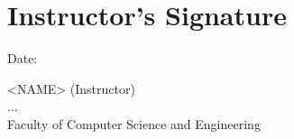 \chapter*{Instructor’s Signature}

\vspace{1cm}

\makebox[0.62\linewidth][l]{\hrulefill}\hspace{0.5cm}Date: \makebox[0.18\linewidth][l]{\hrulefill}

    \begin{flushleft}
    <NAME> (Instructor)\\
    ... \\
    Faculty of Computer Science and Engineering
    \end{flushleft}